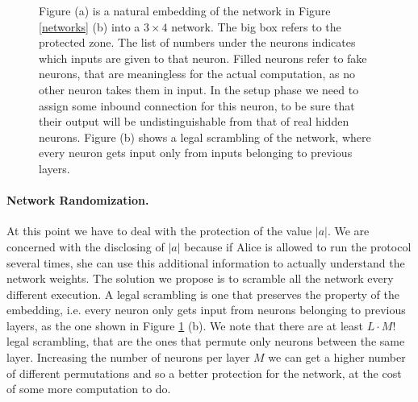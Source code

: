 \documentclass[11pt,oribibl,runningheads]{llncs}
\begin{document}
\begin{figure}
\centering

\qquad {}
 \caption{Figure (a) is a natural embedding of the network in Figure \ref{networks} (b) into
a $3\times 4$ network. The big box refers to the protected zone.
The list of numbers under the neurons indicates which
inputs are given to that neuron. Filled neurons refer to fake
neurons, that are meaningless for the actual computation, as no
other neuron takes them in input. In the setup phase we need to
assign some inbound connection for this neuron, to be sure that
their output will be undistinguishable from that of real hidden neurons.
Figure (b) shows a legal scrambling of the network, where every
neuron gets input only from inputs belonging to previous layers.}
\label{embedding}
\end{figure}


\paragraph{Network Randomization.}
At this point we have to deal with the protection of the value
$|a|$. We are concerned with the disclosing of $|a|$ because if
Alice is allowed to run the protocol several times, she can use
this additional information to actually understand the network
weights. The solution we propose is to scramble all the network
every different execution. A legal scrambling is one that
preserves the property of the embedding, i.e. every neuron only
gets input from neurons belonging to previous layers, as the one
shown in Figure \ref{embedding} (b). We note that there are at
least $L \cdot M!$ legal scrambling, that are the ones that
permute only neurons between the same layer. Increasing the number
of neurons per layer $M$ we can get a higher number of different
permutations and so a better protection for the network, at the
cost of some more computation to do. 
\end{document}
